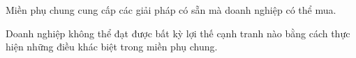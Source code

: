 



Miền phụ chung cung cấp các giải pháp có sẵn mà doanh nghiệp có thể mua.

Doanh nghiệp không thể đạt được bất kỳ lợi thế cạnh tranh nào bằng cách thực hiện những điều khác biệt trong miền phụ chung.
















